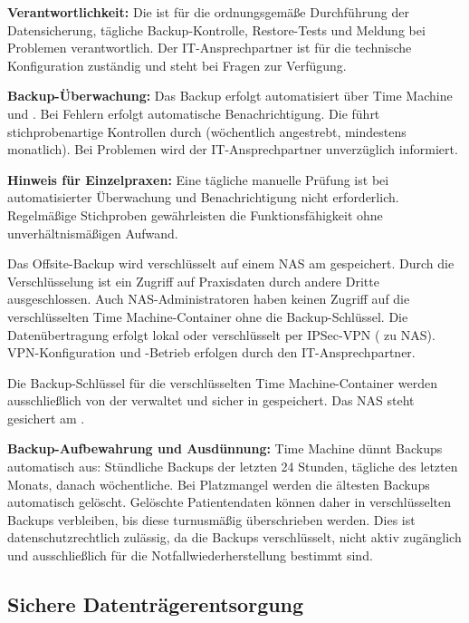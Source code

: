 \textbf{Verantwortlichkeit:} Die \PraxisInhaberBezeichnung{} ist für die ordnungsgemäße Durchführung
der Datensicherung, tägliche Backup-Kontrolle, Restore-Tests und Meldung bei Problemen verantwortlich.
Der IT-Ansprechpartner ist für die technische Konfiguration zuständig und
steht bei Fragen zur Verfügung.

\textbf{Backup-Überwachung:} Das Backup erfolgt automatisiert über Time Machine und \PVSName{}. 
Bei Fehlern erfolgt automatische Benachrichtigung. Die \PraxisInhaberBezeichnung{} führt 
stichprobenartige Kontrollen durch (wöchentlich angestrebt, mindestens monatlich). 
Bei Problemen wird der IT-Ansprechpartner unverzüglich informiert.

\textbf{Hinweis für Einzelpraxen:} Eine tägliche manuelle Prüfung ist bei automatisierter 
Überwachung und Benachrichtigung nicht erforderlich. Regelmäßige Stichproben gewährleisten 
die Funktionsfähigkeit ohne unverhältnismäßigen Aufwand.

Das Offsite-Backup wird verschlüsselt auf einem NAS am \BackupStandort{}
gespeichert. Durch die Verschlüsselung ist ein Zugriff auf Praxisdaten durch andere
Dritte ausgeschlossen. Auch NAS-Administratoren haben keinen Zugriff auf
die verschlüsselten Time Machine-Container ohne die Backup-Schlüssel. Die
Datenübertragung erfolgt lokal oder verschlüsselt per IPSec-VPN (\RouterKurz{} zu NAS).
VPN-Konfiguration und -Betrieb erfolgen durch den IT-Ansprechpartner.

Die Backup-Schlüssel für die verschlüsselten Time Machine-Container werden
ausschließlich von der \PraxisInhaberBezeichnung{} verwaltet und sicher in \PasswortManager{}
gespeichert. Das NAS steht gesichert am \BackupStandort{}.

\textbf{Backup-Aufbewahrung und Ausdünnung:} Time Machine dünnt Backups automatisch aus:
Stündliche Backups der letzten 24 Stunden, tägliche des letzten Monats, danach
wöchentliche. Bei Platzmangel werden die ältesten Backups automatisch gelöscht.
Gelöschte Patientendaten können daher in verschlüsselten Backups verbleiben, bis diese
turnusmäßig überschrieben werden. Dies ist datenschutzrechtlich zulässig, da die Backups
verschlüsselt, nicht aktiv zugänglich und ausschließlich für die Notfallwiederherstellung
bestimmt sind.

\subsection{Sichere Datenträgerentsorgung}
\label{sec:entsorgung}

